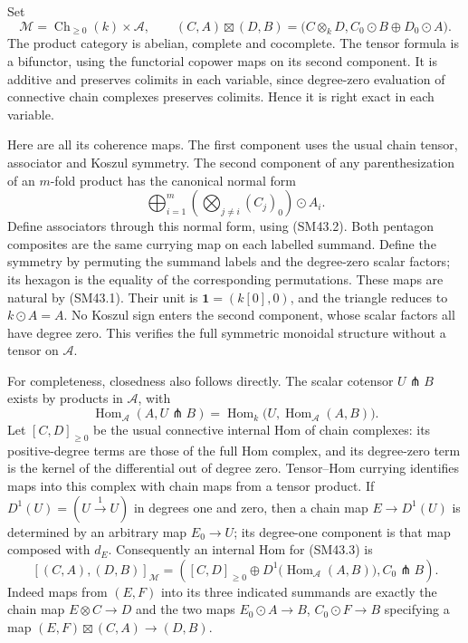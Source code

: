 Set
\[
 \mathcal M=\operatorname{Ch}_{\ge0}(k)\times\mathcal A,
 \qquad
 (C,A)\boxtimes(D,B)=
  \bigl(C\otimes_k D, C_0\odot B\oplus D_0\odot A\bigr).
                                                               \tag{SM43.3}
\]
The product category is abelian, complete and cocomplete.
The tensor formula is a bifunctor, using the functorial copower
maps on its second component.  It is additive and preserves
colimits in each variable, since degree-zero evaluation of
connective chain complexes preserves colimits.  Hence it is
right exact in each variable.

Here are all its coherence maps.  The first component uses the
usual chain tensor, associator and Koszul symmetry.  The second
component of any parenthesization of an \(m\)-fold product has
the canonical normal form
\[
 \bigoplus_{i=1}^{m}
       \left(\bigotimes_{j\ne i}(C_j)_0\right)\odot A_i.
                                                               \tag{SM43.4}
\]
Define associators through this normal form, using (SM43.2).
Both pentagon composites are the same currying map on each
labelled summand.  Define the symmetry by permuting the summand
labels and the degree-zero scalar factors; its hexagon is the
equality of the corresponding permutations.  These maps are
natural by (SM43.1).  Their unit is
\(\mathbf1=(k[0],0)\), and the triangle reduces to
\(k\odot A=A\).  No Koszul sign enters the second component,
whose scalar factors all have degree zero.  This verifies the
full symmetric monoidal structure without a tensor on
\(\mathcal A\).

For completeness, closedness also follows directly.  The scalar
cotensor \(U\pitchfork B\) exists by products in \(\mathcal A\),
with
\[
 \operatorname{Hom}_{\mathcal A}(A,U\pitchfork B)
  =\operatorname{Hom}_k\bigl(U,
                \operatorname{Hom}_{\mathcal A}(A,B)\bigr).
\]
Let \([C,D]_{\ge0}\) be the usual connective internal Hom of
chain complexes: its positive-degree terms are those of the
full Hom complex, and its degree-zero term is the kernel of
the differential out of degree zero.  Tensor--Hom currying
identifies maps into this complex with chain maps from a tensor
product.  If \(D^1(U)=(U\xrightarrow{1}U)\) in degrees one
and zero, then a chain map \(E\to D^1(U)\) is determined
by an arbitrary map \(E_0\to U\); its degree-one component
is that map composed with \(d_E\).  Consequently an internal
Hom for (SM43.3) is
\[
 [(C,A),(D,B)]_{\mathcal M}=
 \left([C,D]_{\ge0}\oplus
          D^1\bigl(\operatorname{Hom}_{\mathcal A}(A,B)\bigr),
                         C_0\pitchfork B\right).             \tag{SM43.5}
\]
Indeed maps from \((E,F)\) into its three indicated summands
are exactly the chain map \(E\otimes C\to D\) and the two
maps \(E_0\odot A\to B\), \(C_0\odot F\to B\) specifying
a map \((E,F)\boxtimes(C,A)\to(D,B)\).

